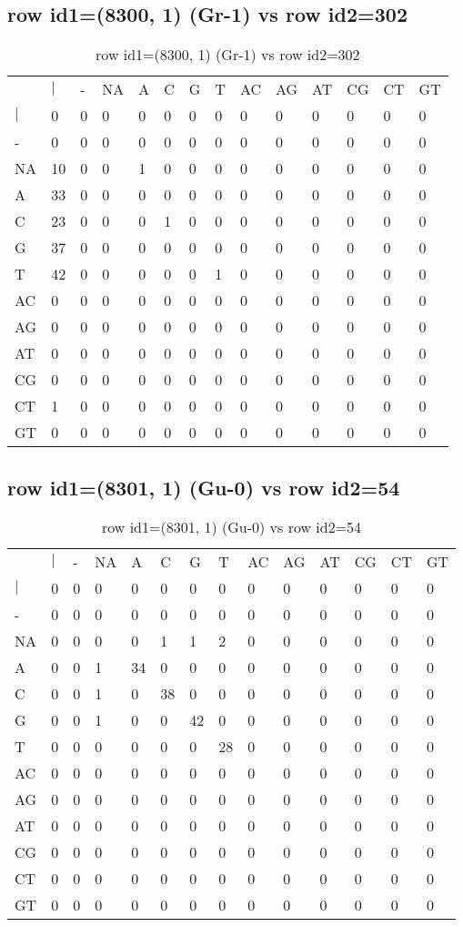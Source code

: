 \subsection{row id1=(8300, 1) (Gr-1) vs row id2=302}
\begin{center}
\begin{longtable}{|l|l|l|l|l|l|l|l|l|l|l|l|l|l|}
\caption{row id1=(8300, 1) (Gr-1) vs row id2=302} \label{table_dm278}\\
\hline
\\
\hline
&$|$&-&NA&A&C&G&T&AC&AG&AT&CG&CT&GT\\
$|$&0&0&0&0&0&0&0&0&0&0&0&0&0\\
-&0&0&0&0&0&0&0&0&0&0&0&0&0\\
NA&10&0&0&1&0&0&0&0&0&0&0&0&0\\
A&33&0&0&0&0&0&0&0&0&0&0&0&0\\
C&23&0&0&0&1&0&0&0&0&0&0&0&0\\
G&37&0&0&0&0&0&0&0&0&0&0&0&0\\
T&42&0&0&0&0&0&1&0&0&0&0&0&0\\
AC&0&0&0&0&0&0&0&0&0&0&0&0&0\\
AG&0&0&0&0&0&0&0&0&0&0&0&0&0\\
AT&0&0&0&0&0&0&0&0&0&0&0&0&0\\
CG&0&0&0&0&0&0&0&0&0&0&0&0&0\\
CT&1&0&0&0&0&0&0&0&0&0&0&0&0\\
GT&0&0&0&0&0&0&0&0&0&0&0&0&0\\
\hline
\end{longtable}
\end{center}

\subsection{row id1=(8301, 1) (Gu-0) vs row id2=54}
\begin{center}
\begin{longtable}{|l|l|l|l|l|l|l|l|l|l|l|l|l|l|}
\caption{row id1=(8301, 1) (Gu-0) vs row id2=54} \label{table_dm280}\\
\hline
\\
\hline
&$|$&-&NA&A&C&G&T&AC&AG&AT&CG&CT&GT\\
$|$&0&0&0&0&0&0&0&0&0&0&0&0&0\\
-&0&0&0&0&0&0&0&0&0&0&0&0&0\\
NA&0&0&0&0&1&1&2&0&0&0&0&0&0\\
A&0&0&1&34&0&0&0&0&0&0&0&0&0\\
C&0&0&1&0&38&0&0&0&0&0&0&0&0\\
G&0&0&1&0&0&42&0&0&0&0&0&0&0\\
T&0&0&0&0&0&0&28&0&0&0&0&0&0\\
AC&0&0&0&0&0&0&0&0&0&0&0&0&0\\
AG&0&0&0&0&0&0&0&0&0&0&0&0&0\\
AT&0&0&0&0&0&0&0&0&0&0&0&0&0\\
CG&0&0&0&0&0&0&0&0&0&0&0&0&0\\
CT&0&0&0&0&0&0&0&0&0&0&0&0&0\\
GT&0&0&0&0&0&0&0&0&0&0&0&0&0\\
\hline
\end{longtable}
\end{center}

